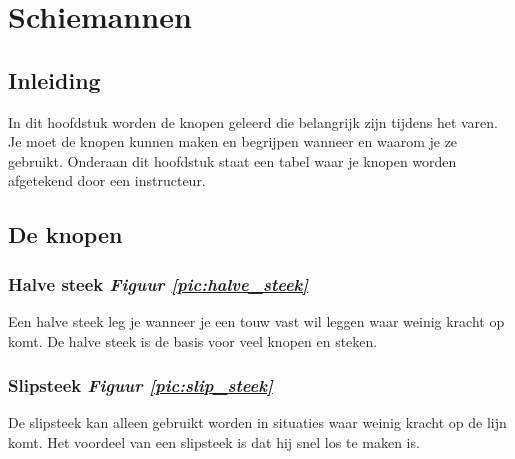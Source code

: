 \chapter{Schiemannen}
\section{Inleiding}
In dit hoofdstuk worden de knopen geleerd die belangrijk zijn tijdens het varen. Je moet de knopen kunnen maken en begrijpen wanneer en waarom je ze gebruikt. Onderaan dit hoofdstuk staat een tabel waar je knopen worden afgetekend door een instructeur. 
\section{De knopen}
\subsection{Halve steek \hfill \hspace{2 cm} \textit{Figuur \ref{pic:halve_steek}} } 
Een halve steek leg je wanneer je een touw vast wil leggen waar weinig kracht op komt. De halve steek is de basis voor veel knopen en steken.
\subsection{Slipsteek \hfill \textit{Figuur \ref{pic:slip_steek}}}
De slipsteek kan alleen gebruikt worden in situaties waar weinig kracht op de lijn komt. Het voordeel van een slipsteek is dat hij snel los te maken is.
